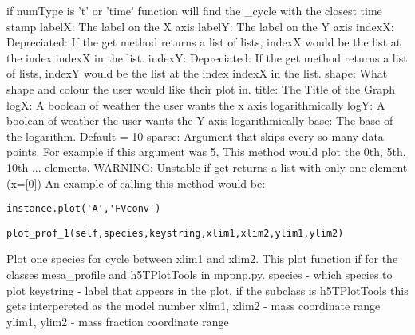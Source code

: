 		if numType is 't' or 'time' function will find the \_cycle with the closest time stamp \newline
		labelX: The label on the X axis \newline
		labelY: The label on the Y axis \newline
		indexX: Depreciated: If the get method returns a list of lists, indexX
			would be the list at the index indexX in the list.\newline
		indexY: Depreciated: If the get method returns a list of lists, indexY
			would be the list at the index indexX in the list.\newline
		shape: What shape and colour the user would like their plot in.
		       \newline
		title: The Title of the Graph \newline
		logX: A boolean of weather the user wants the x axis logarithmically\newline
		logY: A boolean of weather the user wants the Y axis logarithmically\newline
		base: The base of the logarithm. Default = 10\newline
		sparse: Argument that skips every so many data points. For 
			example if this argument was 5, This method would plot
			the 0th, 5th, 10th ... elements.\newline
		WARNING: Unstable if get returns a list with only one element (x=[0])\newline
An example of calling this method would be:
\begin{verbatim}
instance.plot('A','FVconv')
\end{verbatim}

\begin{verbatim}
plot_prof_1(self,species,keystring,xlim1,xlim2,ylim1,ylim2)
\end{verbatim}
Plot one species for cycle between xlim1 and xlim2. This plot function if for the classes mesa\_profile and h5TPlotTools in mppnp.py.\newline		
	species      - which species to plot \newline
	keystring    - label that appears in the plot, if the subclass is h5TPlotTools this gets interpereted as the model number \newline
	xlim1, xlim2 - mass coordinate range\newline                                                 
	ylim1, ylim2 - mass fraction coordinate range\newline\newline


